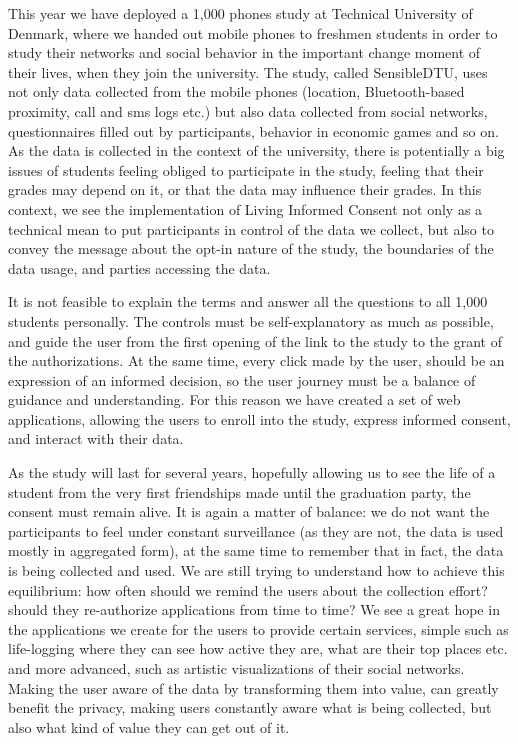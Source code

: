This year we have deployed a 1,000 phones study at Technical University of Denmark, where we handed out mobile phones to freshmen students in order to study their networks and social behavior in the important change moment of their lives, when they join the university. The study, called SensibleDTU, uses not only data collected from the mobile phones (location, Bluetooth-based proximity, call and sms logs etc.) but also data collected from social networks, questionnaires filled out by participants, behavior in economic games and so on. As the data is collected in the context of the university, there is potentially a big issues of students feeling obliged to participate in the study, feeling that their grades may depend on it, or that the data may influence their grades. In this context, we see the implementation of Living Informed Consent not only as a technical mean to put participants in control of the data we collect, but also to convey the message about the opt-in nature of the study, the boundaries of the data usage, and parties accessing the data.

It is not feasible to explain the terms and answer all the questions to all 1,000 students personally. The controls must be self-explanatory as much as possible, and guide the user from the first opening of the link to the study to the grant of the authorizations. At the same time, every click made by the user, should be an expression of an informed decision, so the user journey must be a balance of guidance and understanding. For this reason we have created a set of web applications, allowing the users to enroll into the study, express informed consent, and interact with their data.

As the study will last for several years, hopefully allowing us to see the life of a student from the very first friendships made until the graduation party, the consent must remain alive. It is again a matter of balance: we do not want the participants to feel under constant surveillance (as they are not, the data is used mostly in aggregated form), at the same time to remember that in fact, the data is being collected and used. We are still trying to understand how to achieve this equilibrium: how often should we remind the users about the collection effort? should they re-authorize applications from time to time? We see a great hope in the applications we create for the users to provide certain services, simple such as life-logging where they can see how active they are, what are their top places etc. and more advanced, such as artistic visualizations of their social networks. Making the user aware of the data by transforming them into value, can greatly benefit the privacy, making users constantly aware what is being collected, but also what kind of value they can get out of it.

